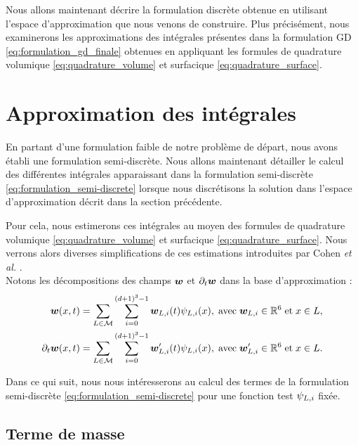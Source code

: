 Nous allons maintenant décrire la formulation discrète obtenue en utilisant
l’espace d’approximation que nous venons de construire. Plus précisément, nous
examinerons les approximations des intégrales présentes dans la formulation
GD \eqref{eq:formulation_gd_finale} obtenues en appliquant les formules
de quadrature volumique \eqref{eq:quadrature_volume} et surfacique
\eqref{eq:quadrature_surface}.
\\


\section{Approximation des intégrales}
\label{sect:approximation_des_integrales}

En partant d’une formulation faible de notre problème de départ, nous avons
établi une formulation semi-discrète. Nous allons maintenant détailler
le calcul des différentes intégrales apparaissant dans
la formulation semi-discrète \eqref{eq:formulation_semi-discrete} lorsque
nous discrétisons la solution dans l’espace d’approximation décrit dans
la section précédente.

Pour cela, nous estimerons ces intégrales au moyen des formules de quadrature
volumique \eqref{eq:quadrature_volume} et surfacique \eqref{eq:quadrature_surface}.
Nous verrons alors diverses simplifications de ces estimations
introduites par Cohen \textit{et al.} \cite{Coh-Fer-Per-2006-1}.
\\

Notons les décompositions des champs $\bm{w}$ et $\partial_{t}\bm{w}$ dans la base
d’approximation :
\begin{subequations}
	\begin{align}
		\bm{w}(x,t) &= \sum_{L \in \mathcal{M}} \sum_{i=0}^{(d + 1)^3 - 1}
			\bm{w}_{L,i}(t) \psi_{L,i}(x) ,
			\; \mathrm{avec} \; \bm{w}_{L,i} \in \mathbb{R}^6
			\; \mathrm{et} \; x \in L ,
		\\
		\partial_{t}\bm{w}(x,t) &= \sum_{L \in \mathcal{M}} \sum_{i=0}^{(d + 1)^3 - 1}
			\bm{w}'_{L,i}(t) \psi_{L,i}(x) ,
			\; \mathrm{avec} \; \bm{w}'_{L,i} \in \mathbb{R}^6
			\; \mathrm{et} \; x \in L .
	\end{align}
\end{subequations}

Dans ce qui suit, nous nous intéresserons au calcul des termes de la formulation
semi-discrète \eqref{eq:formulation_semi-discrete} pour une fonction test
$\psi_{L,i}$ fixée.
\\

\subsection{Terme de masse}
\label{ssect:terme_de_masse}

